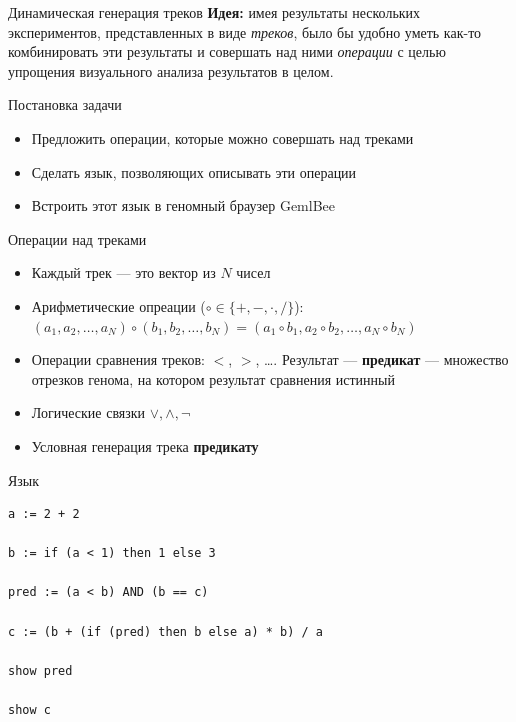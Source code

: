 \begin{frame}{Динамическая генерация треков}
\large{\textbf{Идея:} имея результаты нескольких экспериментов, представленных в виде \emph{треков}, было бы удобно
уметь как-то комбинировать эти результаты и совершать над ними \emph{операции} с целью упрощения визуального
анализа результатов в целом.}
\end{frame}

\begin{frame}{Постановка задачи}
\large{\begin{itemize}
	\item Предложить операции, которые можно совершать над треками
	\item Сделать язык, позволяющих описывать эти операции
	\item Встроить этот язык в геномный браузер GemlBee 
\end{itemize}}
\end{frame}

\begin{frame}{Операции над треками}
\begin{itemize}
	\item Каждый трек --- это вектор из $N$ чисел
	\item Арифметические опреации ($\circ \in \{ +, -, \cdot, / \}$): $(a_1, a_2, \ldots, a_N) \circ (b_1, b_2, \ldots, b_N) = (a_1 \circ b_1, a_2 \circ b_2, \ldots, a_N \circ b_N)$
	\item Операции сравнения треков: $<$, $>$, \ldots. Результат --- \textbf{предикат} --- множество отрезков генома, на котором результат сравнения истинный
	\item Логические связки $\lor, \land, \neg$
	\item Условная генерация трека \textbf{предикату}
\end{itemize}
\end{frame}

\begin{frame}[fragile]{Язык}

\begin{lstlisting}
a := 2 + 2 

b := if (a < 1) then 1 else 3

pred := (a < b) AND (b == c)

c := (b + (if (pred) then b else a) * b) / a

show pred

show c
\end{lstlisting}

\end{frame}

